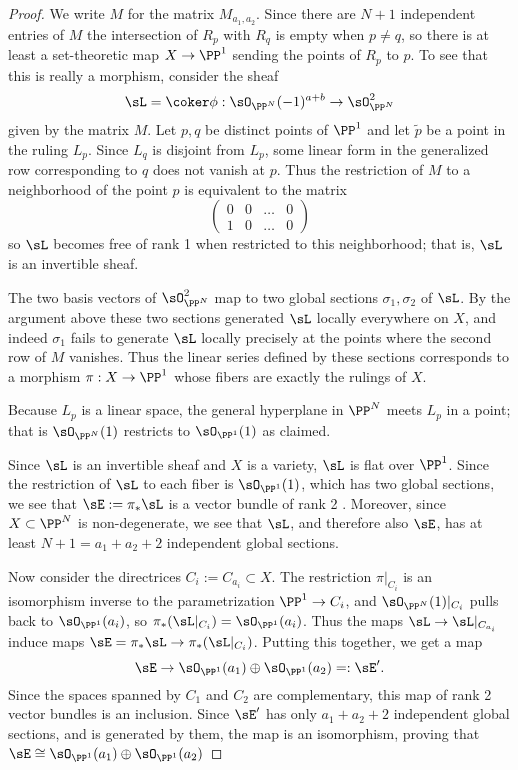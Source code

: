 \begin{proof} We write $M$ for the matrix $M_{a_{1}, a_{2}}$.
Since there are $N+1$ independent entries of $M$ the intersection
of $R_{p}$ with $R_{q}$ is empty when $p\neq q$, so there is at least a set-theoretic map $X\to \PP^{1}$ sending the points of $R_{p}$ to $p$. To see that this is really a morphism, consider the sheaf
$$
\sL = \coker \phi: \sO_{\PP^{N}}(-1)^{a+b} \to \sO_{\PP^{N}}^{2}
$$
given by the matrix $M$. Let $p,q$ be distinct points of $\PP^{1}$ and  let
$\tilde p$ be a point in the ruling $L_p$. Since $L_q$ is disjoint from $L_{p}$, some linear form in the generalized row corresponding to $q$ does not vanish at $p$. Thus
the restriction of $M$ to a neighborhood of the point $p$ is equivalent to the matrix
$$
\begin{pmatrix}
0&0&\dots&0 \\
1&0&\dots&0 
\end{pmatrix}
$$
so $\sL$ becomes free of rank 1 when restricted to this neighborhood; that is, $\sL$ is an invertible sheaf.

The two basis vectors of $\sO_{\PP^{N}}^{2}$ map to two global sections
$\sigma_{1},\sigma_{2}$ of $\sL$. By the argument above these two sections generated $\sL$ locally everywhere on $X$, and indeed $\sigma_{1}$ fails to generate $\sL$ locally precisely at the points where the second row of $M$ vanishes. Thus the linear series
defined by these sections corresponds to a morphism $\pi: X \to \PP^{1}$ whose fibers are exactly the rulings of $X$. 

Because  $L_{p}$ is a linear space, the general hyperplane in $\PP^{N}$
meets $L_{p}$ in a point; that is $\sO_{\PP^{N}}(1)$ restricts to $\sO_{\PP^{1}}(1)$ as claimed.

Since $\sL$ is an invertible sheaf and $X$ is a variety, $\sL$ is flat over $\PP^{1}$. Since the restriction of $\sL$ to each fiber is $\sO_{\PP^{1}}(1)$, which has two global sections, we see that $\sE:= \pi_{*}\sL$ is a vector bundle of rank 2 \cite[Theorem III.12.9]{Hartshorne1977}.
Moreover, since $X\subset \PP^{N}$ is non-degenerate, we see that $\sL$, and therefore also $\sE$, has at least $N+1 = a_{1}+a_{2}+2$ independent global sections. 

Now consider the directrices $C_{i}:= C_{a_{i}}\subset X$.  The restriction
$\pi|_{C_{i}}$ is an isomorphism inverse to the parametrization $\PP^{1} \to C_{i}$, and $\sO_{\PP^{N}}(1)|_{C_{i}}$ pulls back to $\sO_{\PP^{1}}(a_{i})$, so $\pi_{*}(\sL|_{C_i}) = \sO_{\PP^{1}}(a_{i})$. Thus the maps $\sL \to \sL|_{C_{a_{i}}}$
induce maps $\sE = \pi_{*}\sL \to \pi_{*}( \sL|_{C_i})$. Putting this together, we get a map
$$
\sE \to \sO_{\PP^{1}}(a_{1}) \oplus \sO_{\PP^{1}}(a_{2}) =: \sE'.
$$
Since the spaces spanned by $C_{1}$ and $C_{2}$ are complementary, this map of rank 2 vector bundles is an inclusion. Since $\sE'$ has only $a_{1}+a_{2}+2$ independent global sections, and is generated by them, the map is an isomorphism, proving that $\sE \cong \sO_{\PP^{1}}(a_{1}) \oplus \sO_{\PP^{1}}(a_{2})$


\end{proof}
